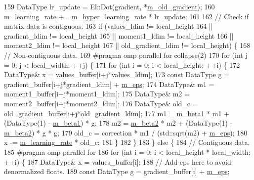 \begin{DoxyCode}
159   DataType lr\_update = El::Dot(gradient, *\hyperlink{classlbann_1_1hypergradient__adam_a2e52355f77edf55bdac8a3eed79f44c4}{m\_old\_gradient});
160   \hyperlink{classlbann_1_1optimizer_ad393dcdcb82b44510c586ed5ec46d4dd}{m\_learning\_rate} += \hyperlink{classlbann_1_1hypergradient__adam_a1066721ebaadb4eed2554b159510ae44}{m\_hyper\_learning\_rate} * lr\_update;
161 
162   \textcolor{comment}{// Check if matrix data is contiguous.}
163   \textcolor{keywordflow}{if} (values\_ldim != local\_height
164       || gradient\_ldim != local\_height
165       || moment1\_ldim != local\_height
166       || moment2\_ldim != local\_height
167       || old\_gradient\_ldim != local\_height) \{
168     \textcolor{comment}{// Non-contiguous data.}
169 \textcolor{preprocessor}{    #pragma omp parallel for collapse(2)}
170     \textcolor{keywordflow}{for} (\textcolor{keywordtype}{int} j = 0; j < local\_width; ++j) \{
171       \textcolor{keywordflow}{for} (\textcolor{keywordtype}{int} i = 0; i < local\_height; ++i) \{
172         DataType& x = values\_buffer[i+j*values\_ldim];
173         \textcolor{keyword}{const} DataType g = gradient\_buffer[i+j*gradient\_ldim] + \hyperlink{classlbann_1_1hypergradient__adam_a5bae9101fcc235d961ae7713706f4ff7}{m\_eps};
174         DataType& m1 = moment1\_buffer[i+j*moment1\_ldim];
175         DataType& m2 = moment2\_buffer[i+j*moment2\_ldim];
176         DataType& old\_c = old\_gradient\_buffer[i+j*old\_gradient\_ldim];
177         m1 = \hyperlink{classlbann_1_1hypergradient__adam_a876a8bc1ee9a47479008d204048724e7}{m\_beta1} * m1 + (DataType(1) - \hyperlink{classlbann_1_1hypergradient__adam_a876a8bc1ee9a47479008d204048724e7}{m\_beta1}) * g;
178         m2 = \hyperlink{classlbann_1_1hypergradient__adam_a0effe7359fa37f02a40f059281580760}{m\_beta2} * m2 + (DataType(1) - \hyperlink{classlbann_1_1hypergradient__adam_a0effe7359fa37f02a40f059281580760}{m\_beta2}) * g * g;
179         old\_c = correction * m1 / (std::sqrt(m2) + \hyperlink{classlbann_1_1hypergradient__adam_a5bae9101fcc235d961ae7713706f4ff7}{m\_eps});
180         x -= \hyperlink{classlbann_1_1optimizer_ad393dcdcb82b44510c586ed5ec46d4dd}{m\_learning\_rate} * old\_c;
181       \}
182     \}
183   \} \textcolor{keywordflow}{else} \{
184     \textcolor{comment}{// Contiguous data.}
185 \textcolor{preprocessor}{    #pragma omp parallel for}
186     \textcolor{keywordflow}{for} (\textcolor{keywordtype}{int} i = 0; i < local\_height * local\_width; ++i) \{
187       DataType& x = values\_buffer[i];
188       \textcolor{comment}{// Add eps here to avoid denormalized floats.}
189       \textcolor{keyword}{const} DataType g = gradient\_buffer[i] + \hyperlink{classlbann_1_1hypergradient__adam_a5bae9101fcc235d961ae7713706f4ff7}{m\_eps};

\end{DoxyCode}
